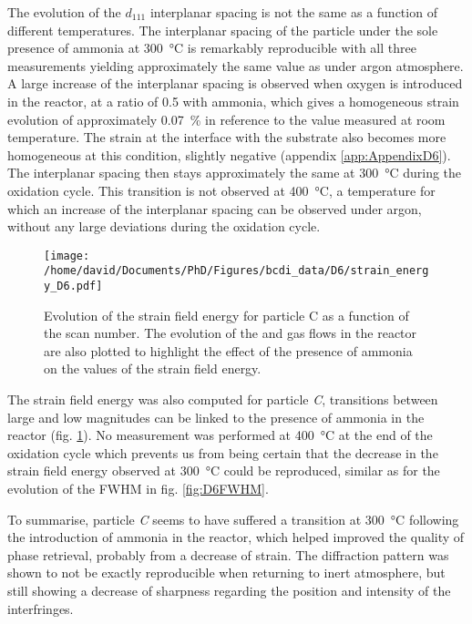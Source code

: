 The evolution of the $d_{111}$ interplanar spacing is not the same as a function of different temperatures.
The interplanar spacing of the particle under the sole presence of ammonia at \qty{300}{\degreeCelsius} is remarkably reproducible with all three measurements yielding approximately the same value as under argon atmosphere.
A large increase of the interplanar spacing is observed when oxygen is introduced in the reactor, at a ratio of \num{0.5} with ammonia, which gives a homogeneous strain evolution of approximately \qty{0.07}{\percent} in reference to the value measured at room temperature.
The strain at the interface with the substrate also becomes more homogeneous at this condition, slightly negative (appendix \ref{app:AppendixD6}).
The interplanar spacing then stays approximately the same at \qty{300}{\degreeCelsius} during the oxidation cycle.
This transition is not observed at \qty{400}{\degreeCelsius}, a temperature for which an increase of the interplanar spacing can be observed under argon, without any large deviations during the oxidation cycle.

\begin{figure}[!htb]
    \centering
    \texttt{[image: /home/david/Documents/PhD/Figures/bcdi\_data/D6/strain\_energy\_D6.pdf]}
    \caption{
        Evolution of the strain field energy for particle C as a function of the scan number.
        The evolution of the  and  gas flows in the reactor are also plotted to highlight the effect of the presence of ammonia on the values of the strain field energy.
    }
    \label{fig:D6SFE}
\end{figure}

The strain field energy was also computed for particle \textit{C}, transitions between large and low magnitudes can be linked to the presence of ammonia in the reactor (fig. \ref{fig:D6SFE}).
No measurement was performed at \qty{400}{\degreeCelsius} at the end of the oxidation cycle which prevents us from being certain that the decrease in the strain field energy observed at \qty{300}{\degreeCelsius} could be reproduced, similar as for the evolution of the FWHM in fig. \ref{fig:D6FWHM}.

To summarise, particle \textit{C} seems to have suffered a transition at \qty{300}{\degreeCelsius} following the introduction of ammonia in the reactor, which helped improved the quality of phase retrieval, probably from a decrease of strain.
The diffraction pattern was shown to not be exactly reproducible when returning to inert atmosphere, but still showing a decrease of sharpness regarding the position and intensity of the interfringes.

